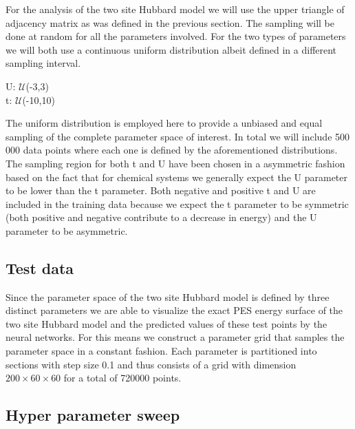 \documentclass[12pt]{article}
\begin{document}
For the analysis of the two site Hubbard model we will use the upper triangle of adjacency matrix as was defined in the previous section. The sampling will be done at random for all the parameters involved. For the two types of parameters we will both use a continuous uniform distribution albeit defined in a different sampling interval.
\begin{center}
	U: $\mathcal{U}$(-3,3) \\
	t: $\mathcal{U}$(-10,10)\\
\end{center}
The uniform distribution is employed here to provide a unbiased and equal sampling of the complete parameter space of interest. In total we will include 500 000 data points where each one is defined by the aforementioned distributions. The sampling region for both t and U have been chosen in a asymmetric fashion based on the fact that for chemical systems we generally expect the U parameter to be lower than the t parameter. Both negative and positive t and U are included in the training data because we expect the t parameter to be symmetric (both positive and negative contribute to a decrease in energy) and the U parameter to be asymmetric. 

\subsection{Test data}

Since the parameter space of the two site Hubbard model is defined by three distinct parameters we are able to visualize the exact PES energy surface of the two site Hubbard model and the predicted values of these test points by the neural networks. For this means we construct a parameter grid that samples the parameter space in a constant fashion. Each parameter is partitioned into sections with step size 0.1 and thus consists of a grid with dimension $200\times60\times60$ for a total of 720000 points. 

\subsection{Hyper parameter sweep}
\end{document}
